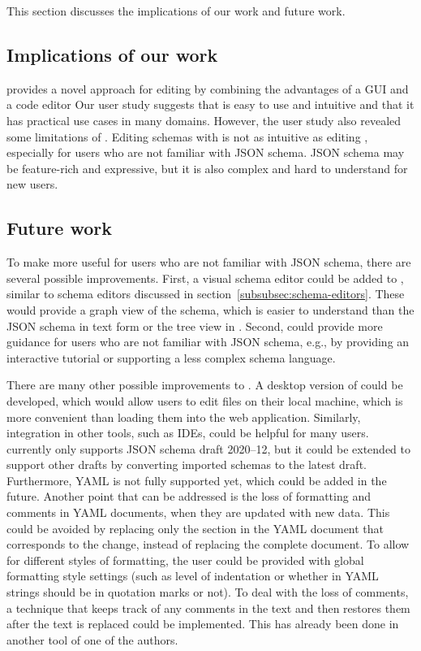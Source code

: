 This section discusses the implications of our work and future work.


\subsection{Implications of our work}\label{subsec:implications-of-our-work}

\toolname{} provides a novel approach for editing \cfgfiles{}
by combining the advantages of a GUI and a code editor
Our user study suggests that \toolname{} is easy to use and intuitive and
that it has practical use cases in many domains.
However, the user study also revealed some limitations of \toolname{}.
Editing schemas with \toolname{} is not as intuitive as editing \cfgfiles{},
especially for users who are not familiar with JSON schema.
JSON schema may be feature-rich and expressive, but it is also complex and
hard to understand for new users.

\subsection{Future work}\label{subsec:future-work}
To make \toolname{} more useful for users who are not familiar with JSON schema,
there are several possible improvements.
First, a visual schema editor could be added to \toolname{}, similar to schema editors
discussed in section~\ref{subsubsec:schema-editors}.
These would provide a graph view of the schema, which is easier to understand than
the JSON schema in text form or the tree view in \toolname{}.
Second, \toolname{} could provide more guidance for users who are not familiar with JSON schema,
e.g., by providing an interactive tutorial or supporting a less complex schema language.

There are many other possible improvements to \toolname{}.
A desktop version of \toolname{} could be developed, which would allow users to
edit files on their local machine, which is more convenient than loading them into the web application.
Similarly, integration in other tools, such as IDEs, could be helpful for many users.
\toolname{} currently only supports JSON schema draft 2020--12, but it could be extended to support
other drafts by converting imported schemas to the latest draft.
Furthermore, YAML is not fully supported yet, which could be added in the future.
Another point that can be addressed is the loss of formatting and comments in YAML documents, when they are updated with new data.
This could be avoided by replacing only the section in the YAML document that corresponds to the change, instead of replacing the complete document.
To allow for different styles of formatting, the user could be provided with global formatting style settings (such as level of indentation or whether in YAML strings should be in quotation marks or not).
To deal with the loss of comments, a technique that keeps track of any comments in the text and then restores them after the text is replaced could be implemented. This has already been done in another tool of one of the authors\cite{githubBspEditor}.

